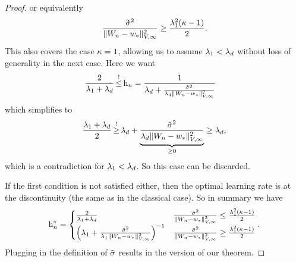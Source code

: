 \begin{proof}
	or equivalently
	\begin{align*}
		\frac{\tilde{\sigma}^2}{
			\|W_n-w_*\|_{V,\infty}^2
		}
		\ge\frac{\lambda_1^2(\kappa-1)}{2}.
	\end{align*}
	This also covers the case \(\kappa=1\), allowing us to assume
	\(\lambda_1 < \lambda_d\) without loss of generality in the next
	case. Here we want 
	\begin{align*}
		\frac{2}{\hesseEV_1+\hesseEV_\dimension} \xle{!} \lr_n
		&= \frac{1}{
			\hesseEV_\dimension
			+ \frac{\tilde{\stdBound}^2}{
				\hesseEV_\dimension\|\Weights_n-\minimum\|_{V,\infty}^2
			}
		}
	\end{align*}
	which simplifies to
	\begin{align*}
		\frac{\hesseEV_1+\hesseEV_\dimension}{2}
		\xge{!} \hesseEV_\dimension
		+ \underbrace{\frac{\tilde{\stdBound}^2}{
			\hesseEV_\dimension\|\Weights_n-\minimum\|_{V,\infty}^2
		}}_{\ge 0}
		\ge \hesseEV_\dimension,
	\end{align*}
	which is a contradiction for \(\lambda_1 < \lambda_d\). So this
	case can be discarded.

	If the first condition is not satisfied either, then the optimal learning
	rate is at the discontinuity (the same as in the classical case). So in
	summary we have
	\begin{align*}
		\text{h}_n^* = \begin{cases}
			\frac{2}{\lambda_1+\lambda_d}
			&\frac{\tilde{\sigma}^2}{
				\|W_n-w_*\|_{V,\infty}^2
			}
			\le \frac{\lambda_1^2(\kappa-1)}{2}\\
			\left(
				\lambda_1 + \frac{\tilde{\sigma}^2}{
					\lambda_1\|W_n-w_*\|_{V,\infty}^2
				}
			\right)^{-1}
			&\frac{\tilde{\sigma}^2}{
				\|W_n-w_*\|_{V,\infty}^2
			}
			\ge \frac{\lambda_1^2(\kappa-1)}{2}
		\end{cases}.
	\end{align*}
	Plugging in the definition of \(\tilde{\sigma}\) results in the version
	of our theorem.


\end{proof}
